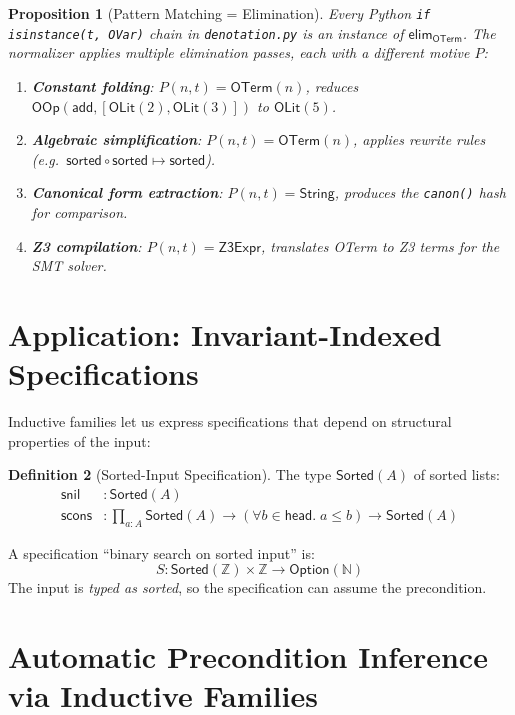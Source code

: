 \documentclass[11pt,a4paper]{report}
\theoremstyle{definition}
\newtheorem{definition}{Definition}[chapter]
\theoremstyle{plain}
\newtheorem{proposition}[definition]{Proposition}
\newcommand{\Nat}{\mathbb{N}}
\newcommand{\Int}{\mathbb{Z}}
\newcommand{\elim}{\mathsf{elim}}
\begin{document}
\begin{proposition}[Pattern Matching = Elimination]
\label{prop:pattern-elim}
Every Python \texttt{if isinstance(t, OVar)} chain in
\texttt{denotation.py} is an instance of $\elim_{\mathsf{OTerm}}$.
The normalizer applies multiple elimination passes, each with a
different motive $P$:
\begin{enumerate}
  \item \textbf{Constant folding}: $P(n,t) = \mathsf{OTerm}(n)$,
    reduces $\mathsf{OOp}(\mathsf{add}, [\mathsf{OLit}(2),
    \mathsf{OLit}(3)])$ to $\mathsf{OLit}(5)$.
  \item \textbf{Algebraic simplification}: $P(n,t) = \mathsf{OTerm}(n)$,
    applies rewrite rules (e.g.\ $\mathsf{sorted} \circ \mathsf{sorted}
    \mapsto \mathsf{sorted}$).
  \item \textbf{Canonical form extraction}: $P(n,t) = \mathsf{String}$,
    produces the \texttt{canon()} hash for comparison.
  \item \textbf{Z3 compilation}: $P(n,t) = \mathsf{Z3Expr}$,
    translates OTerm to Z3 terms for the SMT solver.
\end{enumerate}
\end{proposition}

\section{Application: Invariant-Indexed Specifications}

Inductive families let us express specifications that depend on
structural properties of the input:

\begin{definition}[Sorted-Input Specification]
The type $\mathsf{Sorted}(A)$ of sorted lists:
\begin{align}
  \mathsf{snil} &: \mathsf{Sorted}(A) \\
  \mathsf{scons} &: \prod_{a : A} \mathsf{Sorted}(A) \to
    (\forall b \in \mathsf{head}.\; a \leq b) \to
    \mathsf{Sorted}(A)
\end{align}

A specification ``binary search on sorted input'' is:
\[
  S : \mathsf{Sorted}(\Int) \times \Int \to \mathsf{Option}(\Nat)
\]
The input is \emph{typed as sorted}, so the specification can assume
the precondition.
\end{definition}

\section{Automatic Precondition Inference via Inductive Families}
\end{document}
